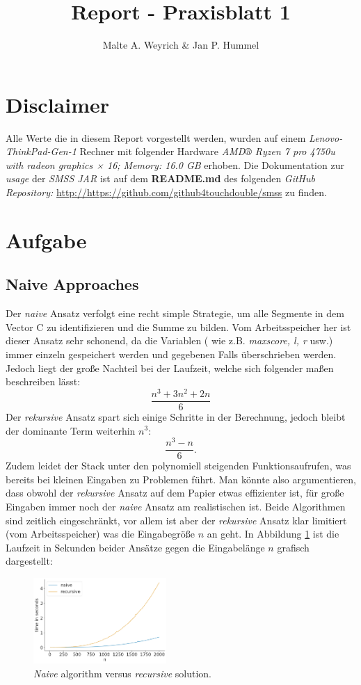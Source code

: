 \documentclass[10pt]{article}
\title{Report - Praxisblatt 1}
\author{Malte A. Weyrich \& Jan P. Hummel}
\begin{document}
\maketitle
\section*{Disclaimer}
    Alle Werte die in diesem Report vorgestellt werden, wurden auf einem \textit{Lenovo-ThinkPad-Gen-1} Rechner mit
    folgender Hardware \textit{AMD® Ryzen 7 pro 4750u with radeon graphics × 16; Memory: 16.0 GB} erhoben. 
    Die Dokumentation zur \textit{usage} der \textit{SMSS JAR} ist auf dem \textbf{README.md} des folgenden
    \textit{GitHub Repository:} \url{http://https://github.com/github4touchdouble/smss} zu finden.

\section{Aufgabe}
    \subsection{Naive Approaches}
    Der \textit{naive} Ansatz verfolgt eine recht simple Strategie, um alle Segmente in dem
    Vector C zu identifizieren und die Summe zu bilden. Vom Arbeitsspeicher her ist dieser Ansatz
    sehr schonend, da die Variablen ( wie z.B. \textit{maxscore, l, r} usw.) immer einzeln gespeichert werden
    und gegebenen Falls überschrieben werden. Jedoch liegt der gro\ss e Nachteil bei der Laufzeit, welche sich
    folgender ma\ss en beschreiben lässt:
    \[
        \frac{n^{3}+3n^{2}+2n}{6} 
    \]
    Der \textit{rekursive} Ansatz spart sich einige Schritte in der Berechnung, jedoch bleibt der dominante Term weiterhin
    $n^{3}$:
    \[
       \frac{n^{3}-n}{6}  
    .\]
    Zudem leidet der Stack unter den polynomiell steigenden Funktionsaufrufen, was bereits bei 
    kleinen Eingaben zu Problemen führt. Man könnte also argumentieren, dass obwohl der \textit{rekursive}
    Ansatz auf dem Papier etwas effizienter ist, für gro\ss e Eingaben immer noch der \textit{naive} Ansatz
    am realistischen ist. Beide Algorithmen sind zeitlich eingeschränkt, vor allem ist aber der 
    \textit{rekursive} Ansatz klar limitiert (vom Arbeitsspeicher) was die Eingabegrö\ss e $n$ an geht.
    In Abbildung \ref{fig:naiv_vs_rec} ist die Laufzeit in Sekunden beider Ansätze gegen die Eingabelänge $n$ grafisch dargestellt:

    \begin{figure}[ht]
        \centering
        \includegraphics[width=0.45\textwidth]{../naive_vs_rec_times.png}
        \caption{\textit{Naive} algorithm versus \textit{recursive} solution.}
        \label{fig:naiv_vs_rec}
    \end{figure}
\end{document}
